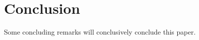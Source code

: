 \section{Conclusion}
\label{sec::conclusion}
Some concluding remarks will conclusively conclude this paper.
